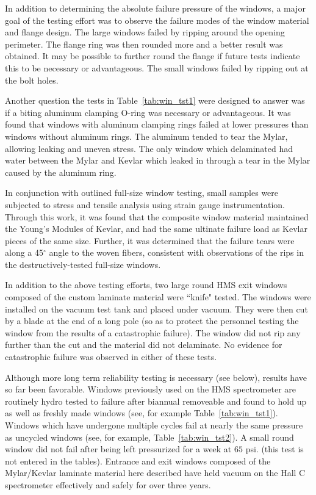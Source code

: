 In addition to determining the absolute failure
pressure of the windows, a major goal of the testing effort was to
observe the failure modes of the
window material and flange design. The large windows failed by
ripping around the opening perimeter. The flange ring was then
rounded more and
a better result was obtained. It may be possible to further round the
flange if future tests indicate this to be necessary or advantageous.
The small windows failed by ripping out at the bolt holes.

Another question the tests in Table~\ref{tab:win_tst1} were designed to
answer was if
a biting aluminum clamping O-ring was necessary or advantageous. It was found
that windows with aluminum clamping rings failed at lower pressures than
windows without aluminum rings. The aluminum tended to tear the Mylar, allowing
leaking and uneven stress. The only window which delaminated had water between
the Mylar and Kevlar which leaked in through a tear in the
Mylar caused by the aluminum ring.

In conjunction with outlined full-size window testing, small samples
were subjected to stress and tensile analysis using strain gauge
instrumentation.  Through this work, it was found that the composite
window material maintained the Young's Modules of Kevlar, and had the
same ultinate failure load as Kevlar pieces of the same size.
Further, it was determined that the failure tears were along a
45$^{\circ}$ angle to the woven fibers, consistent with observations
of the rips in the destructively-tested full-size windows.  

In addition to the above testing efforts, two large round HMS exit windows
composed of the custom laminate material were ``knife" tested. The windows
were installed on the vacuum test tank and placed under vacuum. They were then
cut by a blade at the end of a long pole (so as to protect the personnel
testing the window from the results of a catastrophic failure). The window
did not rip any further than the cut and the
material did not delaminate. No evidence for catastrophic failure
was observed in either of these tests.

Although more long term reliability testing is necessary (see below),
results have so far been favorable.
Windows previously used on the HMS spectrometer are routinely hydro
tested to failure after biannual removeable and found to
hold up as well as freshly made windows (see, for example
Table~\ref{tab:win_tst1}).  Windows which have undergone multiple cycles fail at nearly the same pressure as uncycled
windows (see, for example, Table~\ref{tab:win_tst2}). A small round window did not fail after
being left pressurized for
a week at $65$ psi. (this test is not entered in the tables).
Entrance and exit windows composed of the Mylar/Kevlar laminate
material here described have held vacuum on the Hall C
spectrometer effectively and safely for over three years.


